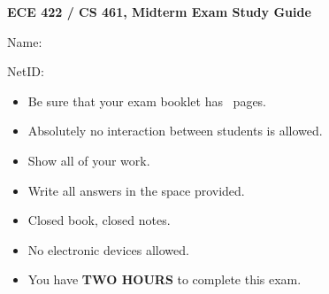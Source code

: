 \documentclass[addpoints]{exam}
\begin{document}
\begin{titlepage}
  \vspace*{\fill}
  \begin{center}
    \Large\textbf{ECE 422 / CS 461, Midterm Exam Study Guide}\\
  \end{center}
  \vspace{.5in}
  \par\large{Name:}\hrulefill\\
  \par\large{NetID:}\hrulefill\\
  \vspace{.5in}
  \begin{itemize}
  \item Be sure that your exam booklet has \numpages\ pages.
  \item Absolutely no interaction between students is allowed.
  \item Show all of your work.
  \item Write all answers in the space provided.
  \item Closed book, closed notes.
  \item No electronic devices allowed.
  \item You have \textbf{TWO HOURS} to complete this exam.
  \end{itemize}
  \vspace*{\fill}
\end{titlepage}
\newpage 

\begin{center}
  \gradetable[v][pages]
\end{center}
\newpage
\end{document}
